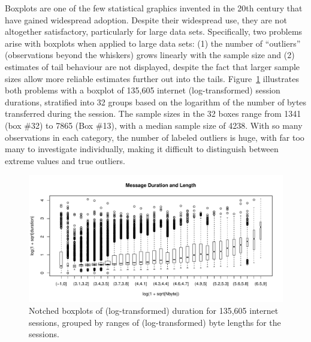 \documentclass[12pt,oneside]{article}
\begin{document}
Boxplots are one of the few statistical graphics invented in the 20th century
that have gained widespread adoption. Despite their widespread use, they are
not altogether satisfactory, particularly for large data sets. Specifically,
two problems arise with boxplots when applied to large data sets: (1) the
number of ``outliers'' (observations beyond the whiskers) grows linearly with
the sample size and (2) estimates of tail behaviour are not displayed, despite
the fact that larger sample sizes allow more reliable estimates further out
into the tails. Figure~\ref{fig:internet-bp} illustrates both problems with a
boxplot of 135,605 internet (log-transformed) session durations, stratified
into 32 groups based on the logarithm of the number of bytes transferred
during the session. The sample sizes in the 32 boxes range from 1341 (box \#32) to 7865 (Box \#13), with a median sample size of 4238. With so many
observations in each category, the number of labeled outliers is huge, with
far too many to investigate individually, making it difficult to distinguish
between extreme values and true outliers.

\begin{figure}[hbtp]
  \centering
  \includegraphics[width=\linewidth]{box2}

  \caption{Notched boxplots \citep{variations.boxplots} of (log-transformed)
  duration for 135,605 internet sessions, grouped by ranges of
  (log-transformed) byte lengths for the sessions.}

  \label{fig:internet-bp} 
\end{figure}
\end{document}
